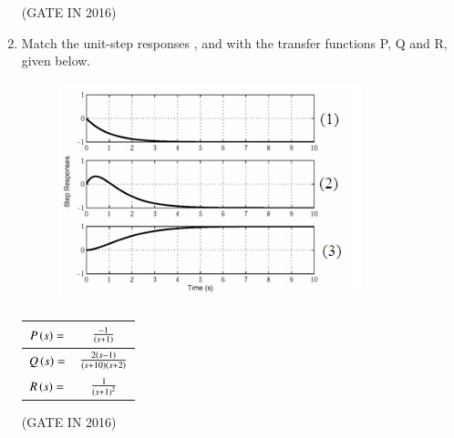 \documentclass[journal,12pt,onecolumn]{IEEEtran}
\theoremstyle{remark}
\begin{document}
\begin{enumerate}
\hfill{(GATE IN 2016)}
\begin{enumerate}
\end{enumerate}

\item Match the unit-step responses ,  and  with the transfer functions P, Q and R, given below.

\begin{figure}[H]
\centering
\includegraphics[width=0.7\columnwidth]{figs/z19.jpg}
\caption*{}
\label{fig:qz19}
\end{figure}


\begin{table}[h]
\centering
\begin{tabular}{|c|c|}
\hline
$P\left(s\right)=$ & $\frac{-1}{\left(s+1\right)}$ \\
\hline
$Q\left(s\right)=$ & $\frac{2\left(s-1\right)}{\left(s+10\right)\left(s+2\right)}$ \\
\hline
$R\left(s\right)=$ & $\frac{1}{\left(s+1\right)^2}$ \\
\hline
\end{tabular}
\caption*{}
\label{tab:q40}
\end{table}


\hfill{(GATE IN 2016)}
\begin{enumerate}
\end{enumerate}


\end{enumerate}
\end{document}
